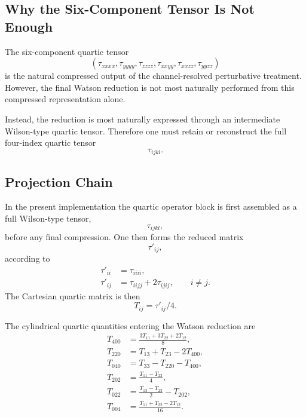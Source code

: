 \documentclass[11pt]{article}
\begin{document}
\subsection{Why the Six-Component Tensor Is Not Enough}
The six-component quartic tensor
\[
(\tau_{xxxx},\tau_{yyyy},\tau_{zzzz},\tau_{xxyy},\tau_{xxzz},\tau_{yyzz})
\]
is the natural compressed output of the channel-resolved perturbative treatment. However, the final Watson reduction is not most naturally performed from this compressed representation alone.

Instead, the reduction is most naturally expressed through an intermediate Wilson-type quartic tensor. Therefore one must retain or reconstruct the full four-index quartic tensor
\[
\tau_{ijkl}.
\]

\subsection{Projection Chain}
In the present implementation the quartic operator block is first assembled as a full Wilson-type tensor,
\[
\tau_{ijkl},
\]
before any final compression. One then forms the reduced matrix
\[
\tau'_{ij},
\]
according to
\begin{align}
\tau'_{ii} &= \tau_{iiii},\\
\tau'_{ij} &= \tau_{iijj} + 2\tau_{ijij},
\qquad i\neq j.
\end{align}
The Cartesian quartic matrix is then
\[
T_{ij} = \tau'_{ij}/4.
\]

The cylindrical quartic quantities entering the Watson reduction are
\begin{align}
T_{400} &= \frac{3T_{11}+3T_{22}+2T_{12}}{8},\\
T_{220} &= T_{13}+T_{23}-2T_{400},\\
T_{040} &= T_{33}-T_{220}-T_{400},\\
T_{202} &= \frac{T_{11}-T_{22}}{4},\\
T_{022} &= \frac{T_{13}-T_{23}}{2}-T_{202},\\
T_{004} &= \frac{T_{11}+T_{22}-2T_{12}}{16}.
\end{align}
\end{document}
